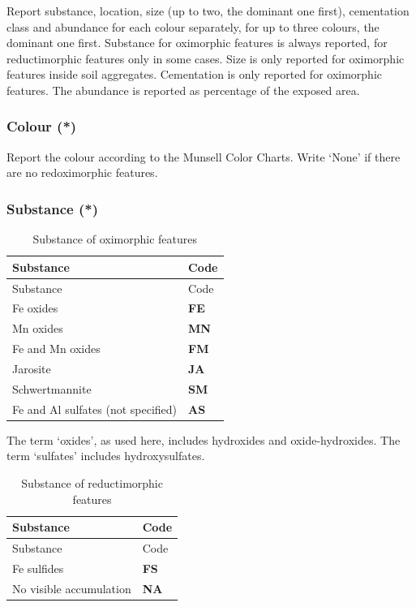 \documentclass[
  letterpaper,
  DIV=11,
  numbers=noendperiod]{scrreprt}
\begin{document}
Report substance, location, size (up to two, the dominant one first),
cementation class and abundance for each colour separately, for up to
three colours, the dominant one first. Substance for oximorphic features
is always reported, for reductimorphic features only in some cases. Size
is only reported for oximorphic features inside soil aggregates.
Cementation is only reported for oximorphic features. The abundance is
reported as percentage of the exposed area.

\hypertarget{colour-1}{%
\subsubsection{Colour (*)}\label{colour-1}}

Report the colour according to the Munsell Color Charts. Write `None' if
there are no redoximorphic features.

\hypertarget{substance}{%
\subsubsection{Substance (*)}\label{substance}}

\begin{longtable}[]{@{}ll@{}}
\caption{Substance of oximorphic features}\tabularnewline
\toprule()
Substance & Code \\
\midrule()
\endfirsthead
\toprule()
Substance & Code \\
\midrule()
\endhead
Fe oxides & \textbf{FE} \\
Mn oxides & \textbf{MN} \\
Fe and Mn oxides & \textbf{FM} \\
Jarosite & \textbf{JA} \\
Schwertmannite & \textbf{SM} \\
Fe and Al sulfates (not specified) & \textbf{AS} \\
\bottomrule()
\end{longtable}

The term `oxides', as used here, includes hydroxides and
oxide-hydroxides. The term `sulfates' includes hydroxysulfates.

\begin{longtable}[]{@{}ll@{}}
\caption{Substance of reductimorphic features}\tabularnewline
\toprule()
Substance & Code \\
\midrule()
\endfirsthead
\toprule()
Substance & Code \\
\midrule()
\endhead
Fe sulfides & \textbf{FS} \\
No visible accumulation & \textbf{NA} \\
\bottomrule()
\end{longtable}
\end{document}
